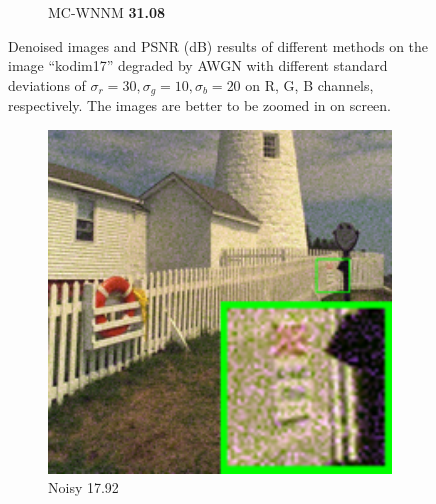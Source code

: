 \begin{figure}
\begin{subfigure}[t]{0.19\textwidth}
		\caption{MC-WNNM \textbf{31.08}}
    \end{subfigure}
    \caption{Denoised images and PSNR (dB) results of different methods on the image ``kodim17'' degraded by AWGN with different standard deviations of $\sigma_{r}=30, \sigma_{g}=10, \sigma_{b}=20$ on R, G, B channels, respectively. The images are better to be zoomed in on screen.}
    \label{fig4-5}
\end{figure}


\begin{figure}
    \centering
    \begin{subfigure}[t]{0.19\textwidth}
        \centering
        \includegraphics[width=1\textwidth]{images/mcwnnm/24images/resize_br_Noisy_nSig301050_kodim19.png}
		\caption{Noisy 17.92}
    \end{subfigure}
    \hfill
    \begin{subfigure}[t]{0.19\textwidth}
        \centering

\end{subfigure}
\end{figure}
